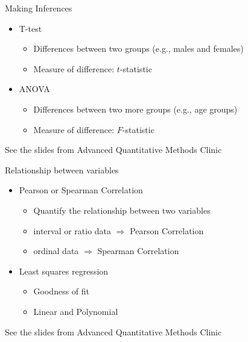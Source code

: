 \documentclass[10pt, compress]{beamer}
\begin{document}
\begin{frame}[t]{Making Inferences}
    \begin{itemize}
        \item T-test
        \begin{itemize}
            \item Differences between two groups (e.g., males and females)
            \item Measure of difference: $t$-statistic
        \end{itemize}
        \item ANOVA
        \begin{itemize}
            \item Differences between two more groups (e.g., age groups)
            \item Measure of difference: $F$-statistic
        \end{itemize}
    \end{itemize}
    See the slides from Advanced Quantitative Methods Clinic
\end{frame}

\begin{frame}[t]{Relationship between variables}
    \begin{itemize}
        \item Pearson or Spearman Correlation
        \begin{itemize}
            \item Quantify the relationship between two variables
            \item interval or ratio data $\Rightarrow$ Pearson Correlation
            \item ordinal data $\Rightarrow$ Spearman Correlation
        \end{itemize}
        \item Least squares regression
        \begin{itemize}
            \item Goodness of fit
            \item Linear and Polynomial
        \end{itemize}
    \end{itemize}
    See the slides from Advanced Quantitative Methods Clinic
\end{frame}
\end{document}
